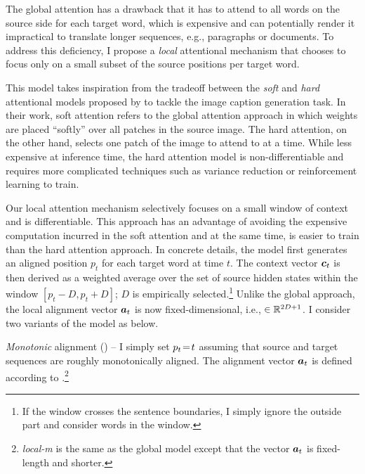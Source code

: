 The global attention has a drawback that it has to attend to all words on the
source side for each target word, which is expensive and can potentially render it impractical to
translate longer sequences, e.g., paragraphs or documents.
To address this deficiency, I propose a {\it local} attentional mechanism that
chooses to focus only on a small subset of the source positions per target word.

This model takes inspiration from the tradeoff between the {\it soft} and {\it
hard} attentional models proposed by  to tackle the image caption
generation task. In their work, soft attention refers to the global attention
approach in which weights are placed ``softly'' over all patches in the source
image. The hard attention, on the other hand, selects one patch
of the image to attend to at a time. While less expensive at inference time, the
hard attention model is non-differentiable and requires more complicated
techniques such as variance reduction or reinforcement learning to train.

Our local attention mechanism selectively focuses on a small window of
context and is differentiable. This approach has an advantage of avoiding the expensive computation incurred in
the soft attention and at the same time, is easier to train than the hard
attention approach.
In concrete details, the model first generates an aligned position $p_t$ for each target word at time $t$. The
context vector $\mbox{\boldmath{$c$}}_{t}$ is then derived as a weighted average over the set of source hidden states within the window $[p_t-D, p_t+D]$; $D$ is
empirically selected.\footnote{If the window crosses the sentence boundaries, I
simply ignore the outside part and consider words in the window.} Unlike the global approach, the local alignment vector $\mbox{\boldmath{$a$}}_{t}$ is now fixed-dimensional, i.e., $\in \mathbb{R}^{2D+1}$. %
I consider two variants of the model as below.

\textit{Monotonic} alignment ({\bf \localm{}}) -- I simply set %
$p_{t}\!=\!t$ assuming that source and target sequences are roughly
monotonically aligned. The alignment vector $\mbox{\boldmath{$a$}}_{t}$ is defined according to
.\footnote{{\it local-m} is the same as
the global model except that the vector $\mbox{\boldmath{$a$}}_{t}$ is
fixed-length and shorter.} %

